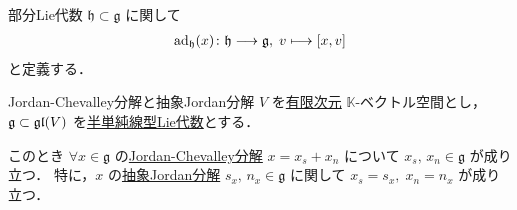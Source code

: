 \documentclass[rep_main]{subfiles}
\begin{document}
部分Lie代数 $\mathfrak{h} \subset \mathfrak{g}$ に関して
\begin{align}
	\ad_{\mathfrak{h}}(x) \colon \mathfrak{h} \lto \mathfrak{g},\; v \lmto \comm{x}{v}
\end{align}
と定義する．

\begin{mytheo}[label=thm:JC]{Jordan-Chevalley分解と抽象Jordan分解}
	$V$ を\underline{有限次元} $\mathbb{K}$-ベクトル空間とし，$\mathfrak{g} \subset \mathfrak{gl}(V)$ を\hyperref[def:semisimple-LieAlg]{半単純線型Lie代数}とする．
	
	このとき $\forall x \in \mathfrak{g}$ の\hyperref[prop:Jordan-Chevalley]{Jordan-Chevalley分解} $x = x_s + x_n$ について $x_s,\, x_n \in \mathfrak{g}$ が成り立つ．
	特に，$x$ の\hyperref[def:abstruct-JC]{抽象Jordan分解} $s_x,\, n_x \in \mathfrak{g}$ に関して $x_s = s_x,\; x_n = n_x$ が成り立つ．
\end{mytheo}
\end{document}
